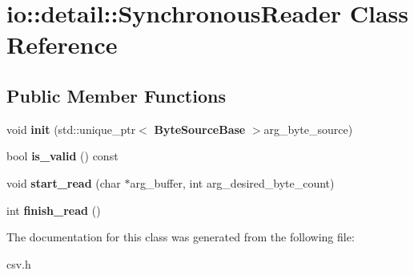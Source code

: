 \section{io\+:\+:detail\+:\+:Synchronous\+Reader Class Reference}
\label{classio_1_1detail_1_1_synchronous_reader}
\subsection*{Public Member Functions}
\begin{DoxyCompactItemize}
\item 
void {\bfseries init} (std\+::unique\+\_\+ptr$<$ {\bf Byte\+Source\+Base} $>$arg\+\_\+byte\+\_\+source)\label{classio_1_1detail_1_1_synchronous_reader_a4dc78563ff667b92ad3096a94e834eb5}

\item 
bool {\bfseries is\+\_\+valid} () const \label{classio_1_1detail_1_1_synchronous_reader_a963aaeed2b0a1177e16b88df61cab948}

\item 
void {\bfseries start\+\_\+read} (char $\ast$arg\+\_\+buffer, int arg\+\_\+desired\+\_\+byte\+\_\+count)\label{classio_1_1detail_1_1_synchronous_reader_a6cad1371b97e14f660914898b16433c4}

\item 
int {\bfseries finish\+\_\+read} ()\label{classio_1_1detail_1_1_synchronous_reader_a519a0cb25c641d2e51b6542749c44606}

\end{DoxyCompactItemize}


The documentation for this class was generated from the following file\+:\begin{DoxyCompactItemize}
\item 
csv.\+h\end{DoxyCompactItemize}
